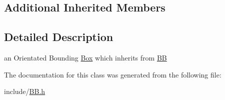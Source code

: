 \subsection*{Additional Inherited Members}


\subsection{Detailed Description}
an Orientated Bounding \hyperlink{class_box}{Box} which inherits from \hyperlink{class_b_b}{B\+B} 

The documentation for this class was generated from the following file\+:\begin{DoxyCompactItemize}
\item 
include/\hyperlink{_b_b_8h}{B\+B.\+h}\end{DoxyCompactItemize}
